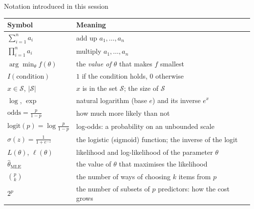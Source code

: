 \documentclass[aspectratio=169,11pt]{beamer}
\begin{document}
\begin{frame}{Notation introduced in this session}
  \footnotesize
  \begin{center}
  \begin{tabular}{@{}ll@{}}
    \toprule
    \textbf{Symbol} & \textbf{Meaning} \\
    \midrule
    $\sum_{i=1}^{n} a_i$ & add up $a_1,\dots,a_n$ \\
    $\prod_{i=1}^{n} a_i$ & multiply $a_1,\dots,a_n$ \\
    $\arg\min_\theta f(\theta)$ & the \emph{value of $\theta$} that makes $f$ smallest \\
    $I(\text{condition})$ & $1$ if the condition holds, $0$ otherwise \\
    $x \in \mathcal{S}$, $|\mathcal{S}|$ & $x$ is in the set $\mathcal{S}$; the size of $\mathcal{S}$ \\
    $\log$, $\exp$ & natural logarithm (base $e$) and its inverse $e^{x}$ \\
    $\mathrm{odds} = \frac{p}{1-p}$ & how much more likely than not \\
    $\mathrm{logit}(p) = \log\frac{p}{1-p}$ & log-odds: a probability on an unbounded scale \\
    $\sigma(z) = \frac{1}{1+e^{-z}}$ & the logistic (sigmoid) function; the inverse of the logit \\
    $L(\theta)$, $\ell(\theta)$ & likelihood and log-likelihood of the parameter $\theta$ \\
    $\hat\theta_{\mathrm{MLE}}$ & the value of $\theta$ that maximises the likelihood \\
    $\binom{p}{k}$ & the number of ways of choosing $k$ items from $p$ \\
    $2^{p}$ & the number of subsets of $p$ predictors: how the cost grows \\
    \bottomrule
  \end{tabular}
  \end{center}
\end{frame}
\end{document}
